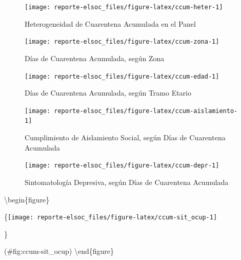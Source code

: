 \documentclass[
  12pt,
  openany]{book}
\begin{document}
\begin{figure}

{\centering \texttt{[image: reporte-elsoc\_files/figure-latex/ccum-heter-1]} 

}

\caption{Heterogeneidad de Cuarentena Acumulada en el Panel}\label{fig:ccum-heter}
\end{figure}

\begin{figure}

{\centering \texttt{[image: reporte-elsoc\_files/figure-latex/ccum-zona-1]} 

}

\caption{Días de Cuarentena Acumulada, según Zona}\label{fig:ccum-zona}
\end{figure}

\begin{figure}

{\centering \texttt{[image: reporte-elsoc\_files/figure-latex/ccum-edad-1]} 

}

\caption{Días de Cuarentena Acumulada, según Tramo Etario}\label{fig:ccum-edad}
\end{figure}

\begin{figure}

{\centering \texttt{[image: reporte-elsoc\_files/figure-latex/ccum-aislamiento-1]} 

}

\caption{Cumplimiento de Aislamiento Social, según Días de Cuarentena Acumulada}\label{fig:ccum-aislamiento}
\end{figure}

\begin{figure}

{\centering \texttt{[image: reporte-elsoc\_files/figure-latex/ccum-depr-1]} 

}

\caption{Sintomatología Depresiva, según Días de Cuarentena Acumulada}\label{fig:ccum-depr}
\end{figure}

\textbackslash begin\{figure\}

\{\centering \texttt{[image: reporte-elsoc\_files/figure-latex/ccum-sit\_ocup-1]}

\}

\caption{Días de Cuarentena Acumulada, según Situación Ocupacional}

(\#fig:ccum-sit\_ocup)
\textbackslash end\{figure\}
\end{document}
